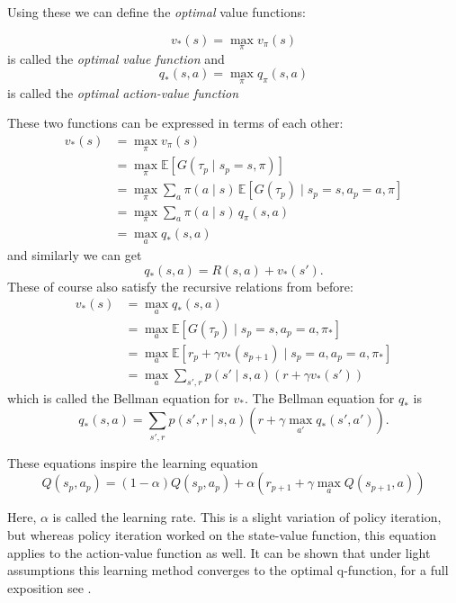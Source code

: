 \documentclass{article}
\theoremstyle{changedot}
\theoremstyle{changedotbreak}
\theoremstyle{nonumberplain}
\newcommand{\m}{\mathbb}
\begin{document}
Using these we can define the \emph{optimal} value functions:

\begin{definition}
  \[v_{*}(s) = \max_{\pi} v_{\pi}(s)\] is called the \emph{optimal value function} and \[q_{*}(s, a) = \max_{\pi} q_{\pi}(s, a)\] is called the \emph{optimal action-value function}
\end{definition}

These two functions can be expressed in terms of each other:
\begin{align*}
  v_{*}(s) &= \max_{\pi} v_{\pi}(s) \\
           &= \max_{\pi} \m E[G(\tau_{p} \mid s_{p} = s, \pi)] \\
           &= \max_{\pi} \sum_{a} \pi(a \mid s) \, \m E[G(\tau_{p}) \mid s_{p} = s, a_{p} = a, \pi] \\
           &= \max_{\pi} \sum_{a} \pi(a \mid s) \, q_{\pi} (s, a) \\
  &= \max_{a} q_{*}(s, a)
\end{align*}
and similarly we can get \[q_{*}(s, a) = R(s, a) + v_{*}(s').\] These of course also satisfy the recursive relations from before:
\begin{align*}
  v_{*}(s) &= \max_{a} q_{*}(s, a) \\
           &= \max_{a} \m E[G(\tau_{p}) \mid s_{p} = s, a_{p} = a, \pi_{*}] \\
           &= \max_{a} \m E[r_{p} + \gamma v_{*}(s_{p+1}) \mid s_{p} = a, a_{p} = a, \pi_{*}] \\
           &= \max_{a} \sum_{s', r} p(s' \mid s, a) (r + \gamma v_{*}(s') )
\end{align*}
which is called the Bellman equation for $v_{*}$. The Bellman equation for $q_{*}$ is
\[q_{*}(s, a) = \sum_{s', r} p(s', r \mid s, a) (r + \gamma \max_{a'} q_{*}(s', a')).\]

These equations inspire the learning equation
\[Q(s_{p}, a_{p}) = (1 - \alpha) Q(s_{p}, a_{p}) + \alpha (r_{p+1} + \gamma \max_{a} Q(s_{p+1}, a))\]

Here, $\alpha$ is called the learning rate. This is a slight variation of policy iteration, but whereas policy iteration worked on the state-value function, this equation applies to the action-value function as well. It can be shown that under light assumptions this learning method converges to the optimal q-function, for a full exposition see \cite{cjch}.
\end{document}
